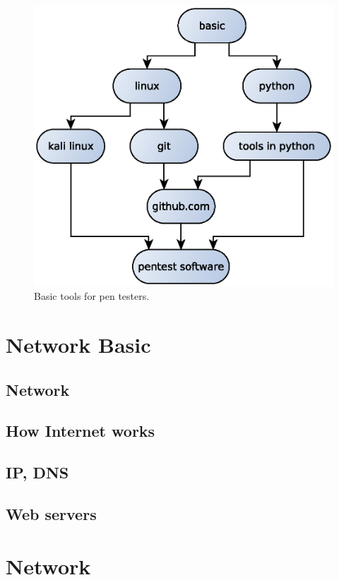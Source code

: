 \documentclass[7x9]{times}
\begin{document}
\begin{center}
	\begin{figure}[h]
		\includegraphics[width=\textwidth]{tools.eps}
		\caption{Basic tools for pen testers.}
	\end{figure}
\end{center}




\chapternotes

\chapter{Network Basic}

\section{Network}
\section{How Internet works}
\section{IP, DNS}
\section{Web servers}


\chapter{Network}
\end{document}
